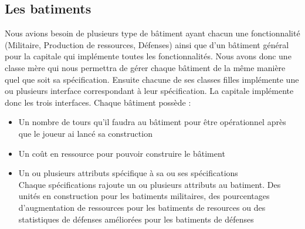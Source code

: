   \subsection{Les batiments}
    Nous avions besoin de plusieurs type de bâtiment ayant chacun une fonctionnalité (Militaire, Production de ressources, Défenses) ainsi que d'un bâtiment général pour la capitale
    qui implémente toutes les fonctionnalités.
    Nous avons donc une classe mère qui nous permettra de gérer chaque bâtiment de la même manière quel que soit sa spécification. Ensuite chacune de ses classes filles implémente
    une ou plusieurs interface correspondant à leur spécification. La capitale implémente donc les trois interfaces.
    \vspace{0.5cm}
    Chaque bâtiment possède :
    \begin{itemize}
      \item Un nombre de tours qu'il faudra au bâtiment pour être opérationnel après que le joueur ai lancé sa construction
      \item Un coût en ressource pour pouvoir construire le bâtiment
      \item Un ou plusieurs attributs spécifique à sa ou ses spécifications \\
	Chaque spécifications rajoute un ou plusieurs attributs au batiment. Des unités en construction pour les batiments militaires, des pourcentages d'augmentation de ressources pour les
	batiments de resources ou des statistiques de défenses améliorées pour les batiments de défenses
    \end{itemize}
    
